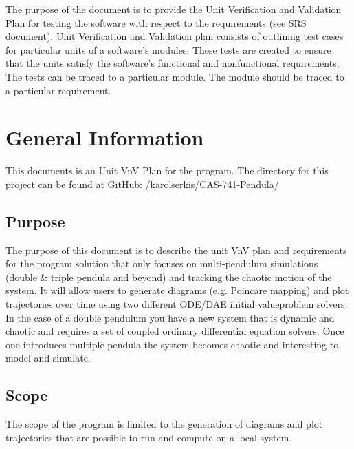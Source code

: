 \documentclass[12pt, titlepage]{article}
\begin{document}
\newpage

\tableofcontents

\listoftables


\newpage


The purpose of the document is to provide the Unit Verification and Validation 
Plan for testing the \progname{}software with 
respect to the requirements (see SRS document). Unit Verification and 
Validation plan consists of outlining test cases for particular units of a 
software's modules. These tests are created to ensure that the units satisfy 
the software's functional and nonfunctional requirements. The tests can be 
traced to a particular module. The module should be traced to a particular 
requirement. 

\section{General Information}

This documents is an Unit VnV Plan for the \progname program. The
directory for this project can be found at GitHub:
\href{https://github.com/karolserkis/CAS-741-Pendula/}
{/karolserkis/CAS-741-Pendula/}\\

\subsection{Purpose}

The purpose of this document is to describe the unit VnV plan and requirements 
for the \progname program solution that only focuses on multi-pendulum 
simulations (double \& triple pendula and beyond) and tracking the chaotic
motion of the system. It will allow users to generate diagrams (e.g. Poincare
mapping) and plot trajectories over time using two different ODE/DAE initial 
valueproblem solvers. In the case of a double pendulum you have a new system 
that is dynamic and chaotic and requires a set of coupled ordinary differential 
equation solvers. Once one introduces multiple
pendula the system becomes chaotic and interesting to model and simulate. 

\subsection{Scope}

The scope of the \progname program is limited to the generation 
of diagrams and plot trajectories that are possible to run and compute on a
local system.
\end{document}
